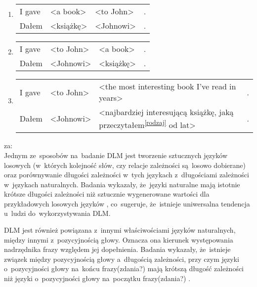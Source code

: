 \documentclass[licencjacka]{pracamgr_Kogni}
\begin{document}
\begin{exe}
    \ex
    \begin{enumerate}
        \item 
        \begin{tabular}[t]{l l l l}
                I gave &<a book> &<to John> &.\\
                Dałem\footnotemark &<książkę> &<Johnowi> &.\\
            \end{tabular}
        \item 
            \begin{tabular}[t]{l l l l}
                I gave &<to John> &<a book> &.\\
                Dałem &<Johnowi> &<książkę> &.\\
            \end{tabular}
        \item
            \begin{tabular}[t]{l l p{8.22cm} l}
                I gave &<to John> &<the most interesting book I've read in years> &.\\
                Dałem &<Johnowi> &<najbardziej interesującą książkę, jaką przeczytałem\textsuperscript{\ref{rodzaj}} od lat> &.\\
            \end{tabular}
    \end{enumerate}
    \label{ex:6}
\end{exe}
za: \citet{Przepiorkowski2023}
\\
Jednym ze~sposobów na~badanie DLM jest tworzenie sztucznych języków losowych (w~których kolejność słów, czy relacje zależności są~losowo dobierane) oraz porównywanie długości zależności w~tych językach z~długościami zależności w~językach naturalnych. Badania wykazały, że~języki naturalne mają istotnie krótsze długości zależności niż sztucznie wygenerowane wartości dla przykładowych losowych języków \citep{FutrellEtAl2015}, co~sugeruje, że~istnieje uniwersalna tendencja u~ludzi do~wykorzystywania DLM.

DLM jest również powiązana z~innymi właściwościami języków naturalnych, między innymi z~pozycyjnością głowy. Oznacza ona kierunek występowania nadrzędnika frazy względem jej dopełnienia. Badania wykazały, że~istnieje związek między pozycyjnością głowy a~długością zależności, przy czym języki o~pozycyjności głowy na~końcu frazy(zdania?) mają krótszą długość zależności niż języki o~pozycyjności głowy na~początku frazy(zdania?) \citep{FutrellEtAl2015}.
\end{document}
